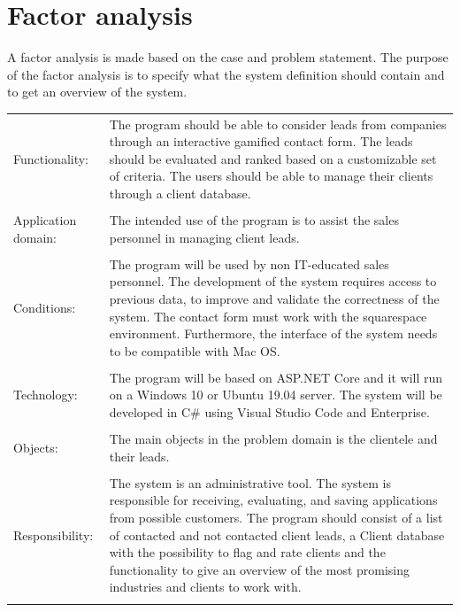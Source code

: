 \section{Factor analysis}
A factor analysis is made based on the case and problem statement. The purpose of the factor analysis is to specify what the system definition should contain and to get an overview of the system.   
\newline \newline
\begin{tabu} to \textwidth {l X }
   \hline
   Functionality: & 
   The program should be able to consider leads from companies through an interactive gamified contact form. The leads should be evaluated and ranked based on a customizable set of criteria. The users should be able to manage their clients through a client database. \\
   
   & \\
   
   Application domain: & 
   The intended use of the program is to assist the sales personnel in managing client leads. \\
   
   & \\
   
   Conditions: & 
   The program will be used by non IT-educated sales personnel. The development of the system requires access to previous data, to improve and validate the correctness of the system. The contact form must work with the squarespace environment. Furthermore, the interface of the system needs to be compatible with Mac OS. \\
   
   & \\
   
   Technology: & 
   The program will be based on ASP.NET Core and it will run on a Windows 10 or Ubuntu 19.04 server. The system will be developed in C\# using Visual Studio Code and Enterprise. \\
   
   & \\
   
   Objects: & 
   The main objects in the problem domain is the clientele and their leads. \\
   
   & \\
   
   Responsibility: & 
   The system is an administrative tool. The system is responsible for receiving, evaluating, and saving applications from possible customers. The program should consist of a list of contacted and not contacted client leads, a Client database with the possibility to flag and rate clients and the functionality to give an overview of the most promising industries and clients to work with. \\
   
   & \\
   \hline
\end{tabu}


